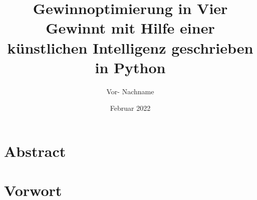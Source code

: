 \documentclass[a4paper,12pt,oneside,BCOR=0mm,bibliography=totoc,parskip=half]{vwa}
\title{Gewinnoptimierung in Vier Gewinnt mit Hilfe einer künstlichen Intelligenz geschrieben in Python} %
\subtitle{}
\author{Vor- Nachname}
\date{Februar 2022}
\begin{document}
\nobibliography*



\begin{titlepage}
    
\end{titlepage}



\chapter*{Abstract}\label{chapter:Abstract}


\chapter*{Vorwort}\label{chapter:Vorwort}


\mainmatter

\setcounter{page}{4} %
\tableofcontents
{}

\setcounter{figure}{0}







\end{document}
